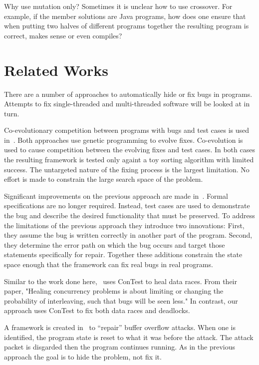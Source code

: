 \documentclass[10pt, conference, compsocconf]{IEEEtran}
\begin{document}
Why use mutation only?  Sometimes it is unclear how to use crossover.  For
example, if the member solutions are Java programs, how does one ensure that
when putting two halves of different programs together the resulting program is
correct, makes sense or even compiles?

\section{Related Works}
\label{sec:related_works}

There are a number of approaches to automatically hide or fix bugs in programs.
Attempts to fix single-threaded and multi-threaded software will be looked at
in turn.

Co-evolutionary competition between programs with bugs and test cases is used
in~\cite{AY08, Arc08, WT10}. Both approaches use genetic programming to evolve
fixes. Co-evolution is used to cause competition between the evolving fixes and
test cases. In both cases the resulting framework is tested only againt a toy
sorting algorithm with limited success. The untargeted nature of the fixing
process is the largest limitation. No effort is made to constrain the large
search space of the problem.

Significant improvements on the previous approach are made in~\cite{FNWG09,
WNLF09, WLF09, WFGN10, GNFW11}. Formal specifications are no longer required.
Instead, test cases are used to demonstrate the bug and describe the desired
functionality that must be preserved. To address the limitations of the
previous approach they introduce two innovations: First, they assume the bug is
written correctly in  another part of the program. Second, they determine the
error path on which the bug occurs and target those statements specifically for
repair.  Together these additions constrain the state space enough that the
framework can fix real bugs in real programs.

Similar to the work done here,~\cite{KLT+07, LVK08} uses ConTest to heal data
races. From their paper, "Healing concurrency problems is about limiting or
changing the probability of interleaving, such that bugs will be seen less." In
contrast, our approach uses ConTest to fix both data races and deadlocks.

A framework is created in~\cite{CB05} to ``repair'' buffer overflow attacks.
When one is identified, the program state is reset to what it was before the
attack. The attack packet is disgarded then the program continues running. As
in the previous approach the goal is to hide the problem, not fix it.
\end{document}
